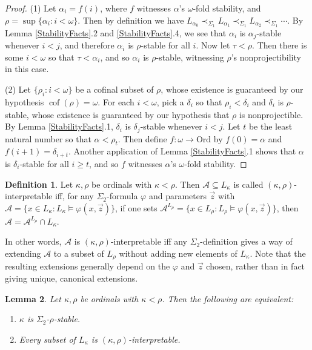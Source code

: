 \documentclass{article}
\newcommand{\Ord}{\mathrm{Ord}}
\theoremstyle{definition}
\newtheorem{definition}{Definition}[section]
\theoremstyle{plain}
\theoremstyle{plain}
\theoremstyle{plain}
\theoremstyle{plain}
\theoremstyle{remark}
\theoremstyle{remark}
\theoremstyle{remark}
\theoremstyle{plain}
\newtheorem{lemma}[definition]{Lemma}
\theoremstyle{plain}
\theoremstyle{plain}
\begin{document}
\begin{proof}
(1) Let $\alpha_i = f(i)$, where $f$ witnesses $\alpha$'s $\omega$-fold stability, and $\rho = \sup\{\alpha_i: i < \omega\}$. Then by definition we have $L_{\alpha_0} \prec_{\Sigma_1} L_{\alpha_1} \prec_{\Sigma_1} L_{\alpha_2} \prec_{\Sigma_1} \cdots$. By Lemma \ref{StabilityFacts}.2 and \ref{StabilityFacts}.4, we see that $\alpha_i$ is $\alpha_j$-stable whenever $i < j$, and therefore $\alpha_i$ is $\rho$-stable for all $i$. Now let $\tau < \rho$. Then there is some $i < \omega$ so that $\tau < \alpha_i$, and so $\alpha_i$ is $\rho$-stable, witnessing $\rho$'s nonprojectibility in this case.

(2) Let $\{\rho_i: i < \omega\}$ be a cofinal subset of $\rho$, whose existence is guaranteed by our hypothesis $\operatorname{cof}(\rho) = \omega$. For each $i < \omega$, pick a $\delta_i$ so that $\rho_i < \delta_i$ and $\delta_i$ is $\rho$-stable, whose existence is guaranteed by our hypothesis that $\rho$ is nonprojectible. By Lemma \ref{StabilityFacts}.1, $\delta_i$ is $\delta_j$-stable whenever $i < j$. Let $t$ be the least natural number so that $\alpha < \rho_t$. Then define $f: \omega \to \Ord$ by $f(0) = \alpha$ and $f(i+1) = \delta_{i+t}$. Another application of Lemma \ref{StabilityFacts}.1 shows that $\alpha$ is $\delta_i$-stable for all $i \geq t$, and so $f$ witnesses $\alpha$'s $\omega$-fold stability.
\end{proof}

\begin{definition}
\label{Interpretable}
Let $\kappa, \rho$ be ordinals with $\kappa < \rho$. Then $\mathcal{A} \subseteq L_\kappa$ is called $(\kappa, \rho)$-interpretable iff, for any $\Sigma_2$-formula $\varphi$ and parameters $\vec{z}$ with $\mathcal{A} = \{x \in L_\kappa: L_\kappa \models \varphi(x, \vec{z})\}$, if one sets $\mathcal{A}^{L_\rho} = \{x \in L_\rho: L_\rho \models \varphi(x, \vec{z})\}$, then $\mathcal{A} = \mathcal{A}^{L_\rho} \cap L_\kappa$.
\end{definition}

In other words, $\mathcal{A}$ is $(\kappa, \rho)$-interpretable iff any $\Sigma_2$-definition gives a way of extending $\mathcal{A}$ to a subset of $L_\rho$ without adding new elements of $L_\kappa$. Note that the resulting extensions generally depend on the $\varphi$ and $\vec{z}$ chosen, rather than in fact giving unique, canonical extensions.

\begin{lemma}
\label{StabilityToInterpretability}
Let $\kappa, \rho$ be ordinals with $\kappa < \rho$. Then the following are equivalent:

\begin{enumerate}
    \item $\kappa$ is $\Sigma_2$-$\rho$-stable.
    \item Every subset of $L_\kappa$ is $(\kappa, \rho)$-interpretable.
\end{enumerate}
\end{lemma}
\end{document}
